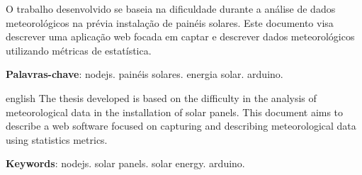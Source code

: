 
\setlength{\absparsep}{18pt} %
\begin{resumo}
  O trabalho desenvolvido se baseia na dificuldade durante a análise de dados meteorológicos na prévia instalação de painéis solares. Este documento visa descrever uma aplicação web focada em captar e descrever dados meteorológicos utilizando métricas de estatística.

 \textbf{Palavras-chave}: nodejs. painéis solares. energia solar. arduino.
\end{resumo}

\begin{resumo}[Abstract]
 \begin{otherlanguage*}{english}
  The thesis developed is based on the difficulty in the analysis of meteorological data in the installation of solar panels. This document aims to describe a web software focused on capturing and describing meteorological data using statistics metrics.

   \vspace{\onelineskip}

   \noindent
   \textbf{Keywords}: nodejs. solar panels. solar energy. arduino.
 \end{otherlanguage*}
\end{resumo}
